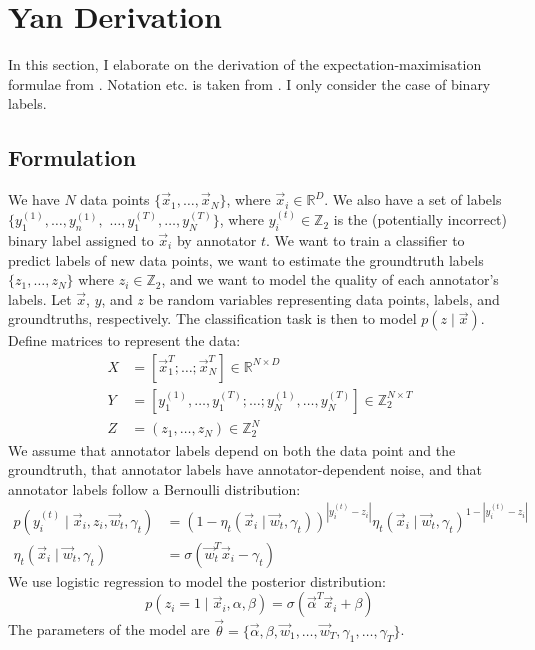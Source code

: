 \section{Yan Derivation}
\label{sec:yan-derivation}
  In this section, I elaborate on the derivation of the expectation-maximisation formulae from \citet{yan10}. Notation etc. is taken from \citet{yan10}. I only consider the case of binary labels.

  \subsection{Formulation}

      We have $N$ data points $\{\vec x_1, \dots, \vec x_N\}$, where $\vec x_i \in \mathbb{R}^D$. We also have a set of labels $\{y_1^{(1)}, \dots, y_n^{(1)},$ $\dots, y_1^{(T)}, \dots, y_N^{(T)}\}$, where $y_i^{(t)} \in \mathbb{Z}_2$ is the (potentially incorrect) binary label assigned to $\vec x_i$ by annotator $t$. We want to train a classifier to predict labels of new data points, we want to estimate the groundtruth labels $\{z_1, \dots, z_N\}$ where $z_i \in \mathbb{Z}_2$, and we want to model the quality of each annotator's labels. Let $\vec x$, $y$, and $z$ be random variables representing data points, labels, and groundtruths, respectively. The classification task is then to model $p(z \mid \vec x)$.
      Define matrices to represent the data:
      \begin{align*}
          X &= [\vec x_1^T; \dots; \vec x_N^T] \in \mathbb{R}^{N \times D}\\
          Y &= [y_1^{(1)}, \dots, y_1^{(T)}; \dots; y_N^{(1)}, \dots, y_N^{(T)}] \in \mathbb{Z}_2^{N \times T}\\
          Z &= (z_1, \dots, z_N) \in \mathbb{Z}_2^N
      \end{align*}
      We assume that annotator labels depend on both the data point and the groundtruth, that annotator labels have annotator-dependent noise, and that annotator labels follow a Bernoulli distribution:
      \begin{align*}
          p(y_i^{(t)} \mid \vec x_i, z_i, \vec w_t, \gamma_t) &= (1 - \eta_t(\vec x_i \mid \vec w_t, \gamma_t))^{|y_i^{(t)} - z_i|} \eta_t(\vec x_i \mid \vec w_t, \gamma_t)^{1 - |y_i^{(t)} - z_i|}\\
          \eta_t(\vec x_i \mid \vec w_t, \gamma_t) &= \sigma(\vec w_t^T \vec x_i - \gamma_t)
      \end{align*}
      We use logistic regression to model the posterior distribution:
      \[
          p(z_i = 1 \mid \vec x_i, \alpha, \beta) = \sigma(\vec \alpha^T \vec x_i + \beta)
      \]
      The parameters of the model are $\vec \theta = \{\vec \alpha, \beta, \vec w_1, \dots, \vec w_T, \gamma_1, \dots, \gamma_T\}$.

